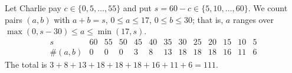 Let Charlie pay \(c\in\{0,5,\dots,55\}\) and put \(s=60-c\in\{5,10,\dots,60\}\). We count pairs \((a,b)\) with \(a+b=s\), \(0\le a\le 17\), \(0\le b\le 30\); that is, \(a\) ranges over \(\max(0,s-30)\le a\le\min(17,s)\).
\[
\begin{array}{c|cccccccccccc}
s&60&55&50&45&40&35&30&25&20&15&10&5\\\hline
\#(a,b)&0&0&0&3&8&13&18&18&18&16&11&6
\end{array}
\]
The total is \(3+8+13+18+18+18+16+11+6=\boxed{111}\).
